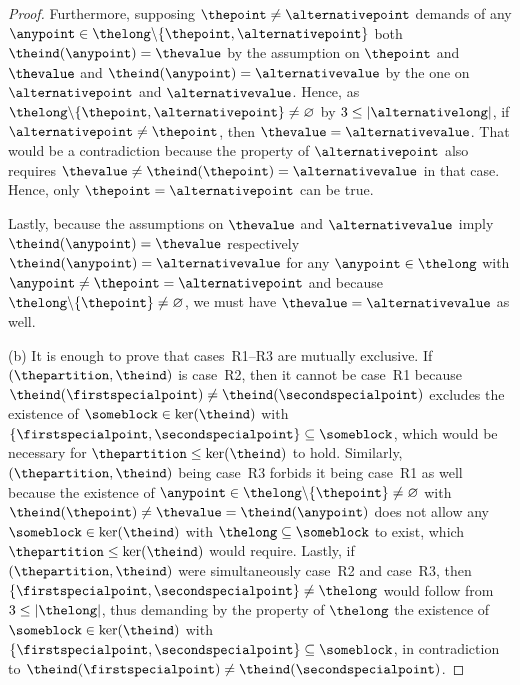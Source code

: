 \documentclass[10pt,a4paper]{amsart}
\numberwithin{equation}{section}
\newcommand{\finerthan}{\mathrel{\leq}}
\newcommand{\scenarioone}{R1}
\newcommand{\scenariotwo}{R2}
\newcommand{\scenariothree}{R3}
\begin{document}
\begin{proof}
 Furthermore,  supposing $\thepoint\neq \alternativepoint$ demands of any $\anypoint\in\thelong\backslash \{\thepoint,\alternativepoint\}$ both $\theind(\anypoint)=\thevalue$ by the assumption on $\thepoint$ and $\thevalue$ and $\theind(\anypoint)=\alternativevalue$ by the one on $\alternativepoint$ and $\alternativevalue$. Hence, as $\thelong\backslash \{\thepoint,\alternativepoint\}\neq \varnothing$  by $3\leq |\alternativelong|$, if  $\alternativepoint\neq \thepoint$, then $\thevalue=\alternativevalue$. That would be a contradiction because the property of $\alternativepoint$ also requires $\thevalue\neq \theind(\thepoint)=\alternativevalue$ in that case. Hence, only $\thepoint=\alternativepoint$ can be true.

 Lastly, because the assumptions on $\thevalue$ and $\alternativevalue$ imply $\theind(\anypoint)=\thevalue$ respectively $\theind(\anypoint)=\alternativevalue$ for any $\anypoint\in\thelong$ with $\anypoint\neq \thepoint=\alternativepoint$ and because  $\thelong\backslash \{\thepoint\}\neq \varnothing$, we must have $\thevalue=\alternativevalue$ as well.

 (b)
 It is enough to prove that cases~\scenarioone{}--\scenariothree{} are mutually exclusive.
 If $(\thepartition,\theind)$ is case~\scenariotwo, then it cannot be case~\scenarioone{} because $\theind(\firstspecialpoint)\neq \theind(\secondspecialpoint)$ excludes the existence of $\someblock\in \ker(\theind)$ with $\{\firstspecialpoint,\secondspecialpoint\}\subseteq \someblock$, which would be necessary for  $\thepartition\finerthan\ker(\theind)$ to hold.
Similarly, $(\thepartition,\theind)$ being case~\scenariothree{} forbids it being case~\scenarioone{} as well because the existence of $\anypoint\in \thelong\backslash \{\thepoint\}\neq\varnothing$ with $\theind(\thepoint)\neq \thevalue=\theind(\anypoint)$ does not allow  any $\someblock\in\ker(\theind)$ with $\thelong\subseteq \someblock$ to exist, which $\thepartition\finerthan\ker(\theind)$ would require.
 Lastly, if~$(\thepartition,\theind)$ were  simultaneously case~\scenariotwo{} and case~\scenariothree{}, then $\{\firstspecialpoint,\secondspecialpoint\}\neq\thelong$ would follow from $3\leq |\thelong|$, thus demanding by the property of $\thelong$ the existence of $\someblock\in\ker(\theind)$ with $\{\firstspecialpoint,\secondspecialpoint\}\subseteq \someblock$, in  contradiction to $\theind(\firstspecialpoint)\neq\theind(\secondspecialpoint)$.
\end{proof}
\end{document}
